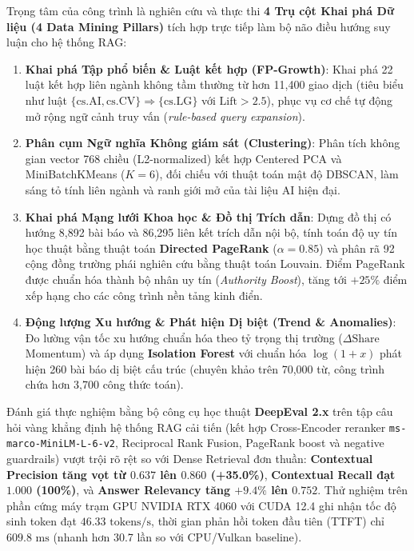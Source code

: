 Trọng tâm của công trình là nghiên cứu và thực thi \textbf{4 Trụ cột Khai phá Dữ liệu (4 Data Mining Pillars)} tích hợp trực tiếp làm bộ não điều hướng suy luận cho hệ thống RAG:
\begin{enumerate}[label=(\arabic*), itemsep=1pt, topsep=1pt, parsep=0pt]
  \item \textbf{Khai phá Tập phổ biến \& Luật kết hợp (FP-Growth)}: Khai phá 22 luật kết hợp liên ngành không tầm thường từ hơn 11,400 giao dịch (tiêu biểu như luật $\{\text{cs.AI}, \text{cs.CV}\} \Rightarrow \{\text{cs.LG}\}$ với $\text{Lift} > 2.5$), phục vụ cơ chế tự động mở rộng ngữ cảnh truy vấn (\textit{rule-based query expansion}).
  \item \textbf{Phân cụm Ngữ nghĩa Không giám sát (Clustering)}: Phân tích không gian vector 768 chiều (L2-normalized) kết hợp Centered PCA và MiniBatchKMeans ($K=6$), đối chiếu với thuật toán mật độ DBSCAN, làm sáng tỏ tính liên ngành và ranh giới mở của tài liệu AI hiện đại.
  \item \textbf{Khai phá Mạng lưới Khoa học \& Đồ thị Trích dẫn}: Dựng đồ thị có hướng 8,892 bài báo và 86,295 liên kết trích dẫn nội bộ, tính toán độ uy tín học thuật bằng thuật toán \textbf{Directed PageRank} ($\alpha=0.85$) và phân rã 92 cộng đồng trường phái nghiên cứu bằng thuật toán Louvain. Điểm PageRank được chuẩn hóa thành bộ nhân uy tín (\textit{Authority Boost}), tăng tới $+25\%$ điểm xếp hạng cho các công trình nền tảng kinh điển.
  \item \textbf{Động lượng Xu hướng \& Phát hiện Dị biệt (Trend \& Anomalies)}: Đo lường vận tốc xu hướng chuẩn hóa theo tỷ trọng thị trường ($\Delta \text{Share}$ Momentum) và áp dụng \textbf{Isolation Forest} với chuẩn hóa $\log(1+x)$ phát hiện 260 bài báo dị biệt cấu trúc (chuyên khảo trên 70,000 từ, công trình chứa hơn 3,700 công thức toán).
\end{enumerate}

Đánh giá thực nghiệm bằng bộ công cụ học thuật \textbf{DeepEval 2.x} trên tập câu hỏi vàng khẳng định hệ thống RAG cải tiến (kết hợp Cross-Encoder reranker \texttt{ms-marco-MiniLM-L-6-v2}, Reciprocal Rank Fusion, PageRank boost và negative guardrails) vượt trội rõ rệt so với Dense Retrieval đơn thuần: \textbf{Contextual Precision tăng vọt từ $0.637$ lên $0.860$ (+35.0\%)}, \textbf{Contextual Recall đạt $1.000$ (100\%)}, và \textbf{Answer Relevancy tăng $+9.4\%$ lên $0.752$}. Thử nghiệm trên phần cứng máy trạm GPU NVIDIA RTX 4060 với CUDA 12.4 ghi nhận tốc độ sinh token đạt $46.33\text{ tokens/s}$, thời gian phản hồi token đầu tiên (TTFT) chỉ $609.8\text{ ms}$ (nhanh hơn 30.7 lần so với CPU/Vulkan baseline). 

